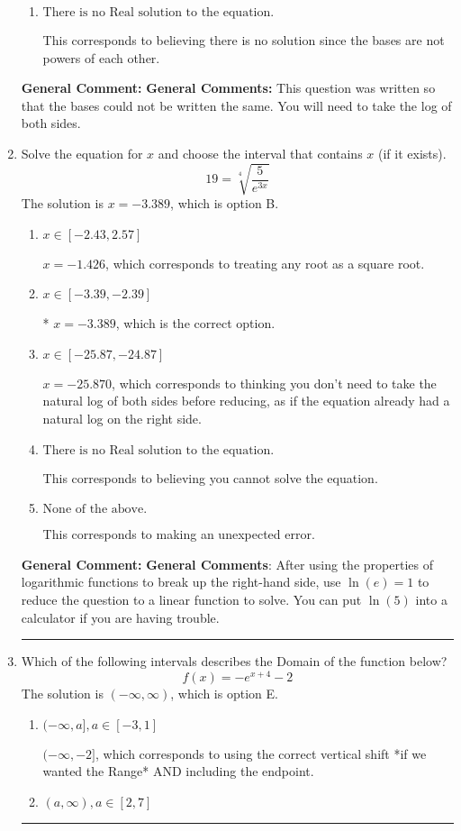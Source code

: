 \documentclass{extbook}[14pt]
\newcommand{\litem}[1]{\item #1

\rule{\textwidth}{0.4pt}}
\begin{document}
\begin{enumerate}
{\begin{enumerate}[label=\Alph*.]
* $x = -1.495$, which is the correct option.
\item \( \text{There is no Real solution to the equation.} \)

This corresponds to believing there is no solution since the bases are not powers of each other.
\end{enumerate}

\textbf{General Comment:} \textbf{General Comments:} This question was written so that the bases could not be written the same. You will need to take the log of both sides.
}
\litem{
 Solve the equation for $x$ and choose the interval that contains $x$ (if it exists).
\[  19 = \sqrt[4]{\frac{5}{e^{3x}}} \]
The solution is \( x = -3.389 \), which is option B.\begin{enumerate}[label=\Alph*.]
\item \( x \in [-2.43, 2.57] \)

$x = -1.426$, which corresponds to treating any root as a square root.
\item \( x \in [-3.39, -2.39] \)

* $x = -3.389$, which is the correct option.
\item \( x \in [-25.87, -24.87] \)

$x = -25.870$, which corresponds to thinking you don't need to take the natural log of both sides before reducing, as if the equation already had a natural log on the right side.
\item \( \text{There is no Real solution to the equation.} \)

This corresponds to believing you cannot solve the equation.
\item \( \text{None of the above.} \)

This corresponds to making an unexpected error.
\end{enumerate}

\textbf{General Comment:} \textbf{General Comments}: After using the properties of logarithmic functions to break up the right-hand side, use $\ln(e) = 1$ to reduce the question to a linear function to solve. You can put $\ln(5)$ into a calculator if you are having trouble.
}
\litem{
Which of the following intervals describes the Domain of the function below?
\[ f(x) = -e^{x+4}-2 \]
The solution is \( (-\infty, \infty) \), which is option E.\begin{enumerate}[label=\Alph*.]
\item \( (-\infty, a], a \in [-3, 1] \)

$(-\infty, -2]$, which corresponds to using the correct vertical shift *if we wanted the Range* AND including the endpoint.
\item \( (a, \infty), a \in [2, 7] \)


\end{enumerate}}
\end{enumerate}
\end{document}
